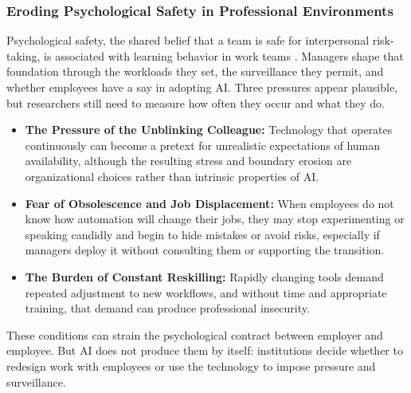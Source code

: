 \documentclass{article}
\begin{document}
\subsubsection{Eroding Psychological Safety in Professional Environments}
Psychological safety, the shared belief that a team is safe for interpersonal risk-taking, is associated with learning behavior in work teams \citep{ref59}. Managers shape that foundation through the workloads they set, the surveillance they permit, and whether employees have a say in adopting AI. Three pressures appear plausible, but researchers still need to measure how often they occur and what they do.
\begin{itemize}
    \item \textbf{The Pressure of the Unblinking Colleague:} Technology that operates continuously can become a pretext for unrealistic expectations of human availability, although the resulting stress and boundary erosion are organizational choices rather than intrinsic properties of AI.
    \item \textbf{Fear of Obsolescence and Job Displacement:} When employees do not know how automation will change their jobs, they may stop experimenting or speaking candidly and begin to hide mistakes or avoid risks, especially if managers deploy it without consulting them or supporting the transition.
    \item \textbf{The Burden of Constant Reskilling:} Rapidly changing tools demand repeated adjustment to new workflows, and without time and appropriate training, that demand can produce professional insecurity.
\end{itemize}
These conditions can strain the psychological contract between employer and employee. But AI does not produce them by itself: institutions decide whether to redesign work with employees or use the technology to impose pressure and surveillance.
\end{document}
